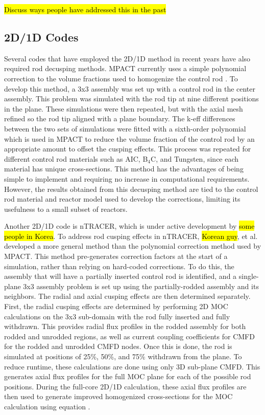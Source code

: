 \hl{Discuss ways people have addressed this in the past}

\subsection{2D/1D Codes}

Several codes that have employed the 2D/1D method in recent years have also required rod decusping methods.  MPACT currently uses a simple polynomial correction to the volume fractions used to homogenize the control rod \cite{MC2015_VCS_Cycle_Depletion}.  To develop this method, a 3x3 assembly was set up with a control rod in the center assembly.  This problem was simulated with the rod tip at nine different positions in the plane.  These simulations were then repeated, but with the axial mesh refined so the rod tip aligned with a plane boundary.  The k-eff differences between the two sets of simulations were fitted with a sixth-order polynomial which is used in MPACT to reduce the volume fraction of the control rod by an appropriate amount to offset the cusping effects.  This process was repeated for different control rod materials such as AIC, B$_4$C, and Tungsten, since each material has unique cross-sections.  This method has the advantages of being simple to implement and requiring no increase in computational requirements.  However, the results obtained from this decusping method are tied to the control rod material and reactor model used to develop the corrections, limiting its usefulness to a small subset of reactors.

Another 2D/1D code is nTRACER, which is under active development by \hl{some people in Korea}.  To address rod cusping effects in nTRACER, \hl{Korean guy}, et al. developed a more general method than the polynomial correction method used by MPACT.  This method pre-generates correction factors at the start of a simulation, rather than relying on hard-coded corrections.  To do this, the assembly that will have a partially inserted control rod is identified, and a single-plane 3x3 assembly problem is set up using the partially-rodded assembly and its neighbors.  The radial and axial cusping effects are then determined separately.  First, the radial cusping effects are determined by performing 2D MOC calculations on the 3x3 sub-domain with the rod fully inserted and fully withdrawn.  This provides radial flux profiles in the rodded assembly for both rodded and unrodded regions, as well as current coupling coefficients for CMFD for the rodded and unrodded CMFD nodes.  Once this is done, the rod is simulated at positions of 25\%, 50\%, and 75\% withdrawn from the plane.  To reduce runtime, these calculations are done using only 3D sub-plane CMFD.  This generates axial flux profiles for the full MOC plane for each of the possible rod positions.  During the full-core 2D/1D calculation, these axial flux profiles are then used to generate improved homogenized cross-sections for the MOC calculation using equation \cite{ICAPPcontrolRodDecuspingNTRACER}.

